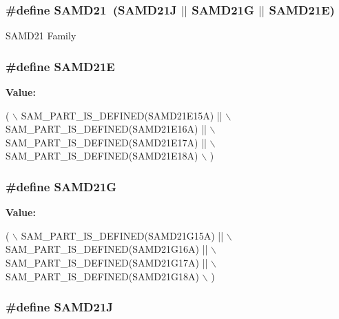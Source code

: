 \hypertarget{group__sam__part__macros__group_gab9217b15071242235d3014381d61dbf7}{
\subsubsection[{S\-A\-M\-D21}]{\setlength{\rightskip}{0pt plus 5cm}\#define S\-A\-M\-D21~(S\-A\-M\-D21\-J $|$$|$ S\-A\-M\-D21\-G $|$$|$ S\-A\-M\-D21\-E)}}\label{group__sam__part__macros__group_gab9217b15071242235d3014381d61dbf7}
S\-A\-M\-D21 Family \hypertarget{group__sam__part__macros__group_gaea4cafdd5e8defbc23a43eb5bb10578c}{
\subsubsection[{S\-A\-M\-D21\-E}]{\setlength{\rightskip}{0pt plus 5cm}\#define S\-A\-M\-D21\-E}}\label{group__sam__part__macros__group_gaea4cafdd5e8defbc23a43eb5bb10578c}
{\bfseries Value\-:}
\begin{DoxyCode}
( \(\backslash\)
                SAM\_PART\_IS\_DEFINED(SAMD21E15A) || \(\backslash\)
                SAM\_PART\_IS\_DEFINED(SAMD21E16A) || \(\backslash\)
                SAM\_PART\_IS\_DEFINED(SAMD21E17A) || \(\backslash\)
                SAM\_PART\_IS\_DEFINED(SAMD21E18A) \(\backslash\)
        )
\end{DoxyCode}
\hypertarget{group__sam__part__macros__group_ga38b8f6ee1c68255f5fc157f564bb9db9}{
\subsubsection[{S\-A\-M\-D21\-G}]{\setlength{\rightskip}{0pt plus 5cm}\#define S\-A\-M\-D21\-G}}\label{group__sam__part__macros__group_ga38b8f6ee1c68255f5fc157f564bb9db9}
{\bfseries Value\-:}
\begin{DoxyCode}
( \(\backslash\)
                SAM\_PART\_IS\_DEFINED(SAMD21G15A) || \(\backslash\)
                SAM\_PART\_IS\_DEFINED(SAMD21G16A) || \(\backslash\)
                SAM\_PART\_IS\_DEFINED(SAMD21G17A) || \(\backslash\)
                SAM\_PART\_IS\_DEFINED(SAMD21G18A) \(\backslash\)
        )
\end{DoxyCode}
\hypertarget{group__sam__part__macros__group_ga55d9b92dcaef90e466055b1792d06d8a}{
\subsubsection[{S\-A\-M\-D21\-J}]{\setlength{\rightskip}{0pt plus 5cm}\#define S\-A\-M\-D21\-J}}\label{group__sam__part__macros__group_ga55d9b92dcaef90e466055b1792d06d8a}
